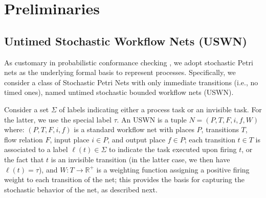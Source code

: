 
\newcommand{\uswn}{USWN\xspace}
\newcommand{\net}{\ensuremath{N}}
\newcommand{\marking}{m}
\newcommand{\enaset}[2]{E_{#2}(#1)}
\newcommand{\fire}[4]{#1\xrightarrow{#2}_{#4}#3}
\newcommand{\prob}[3]{\mathbb{P}_{#2,#3}(#1)}
\newcommand{\rg}[1]{RG(#1)}
 
\section{Preliminaries}
\subsection{Untimed Stochastic Workflow Nets (USWN)}\label{subsec:spn}
As customary in probabilistic conformance checking \cite{lavori-su-prob-conformance}, we adopt stochastic Petri 
nets \cite{MarsanCB84,Desel1998,RoggeSoltiAW13} as the underlying formal basis to represent processes. Specifically, 
we consider a class of Stochastic Petri Nets with only immediate transitions (i.e., no timed ones), named untimed stochastic 
bounded workflow nets (\uswn). 

Consider a set $\Sigma$ of labels indicating either a process task or an invisible task. For the latter, we use the special label $\tau$.
%
An \uswn is a tuple $\net = (P,T,F,i,f,W)$ where:
$(P,T,F,i,f)$ is a standard workflow net with places $P$, transitions $T$, flow relation $F$, input place $i \in P$, and output place 
$f \in P$; each transition $t \in T$ is associated to a label $\ell(t) \in \Sigma$ to indicate the task executed upon firing $t$, or the 
fact that $t$ is an invisible transition (in the latter case, we then have $\ell(t) = \tau$), and
$W\colon T\to \mathbb{R}^+$ is a weighting function assigning a positive firing weight to each transition of the net; this provides 
the basis for capturing the stochastic behavior of the net, as described next.

